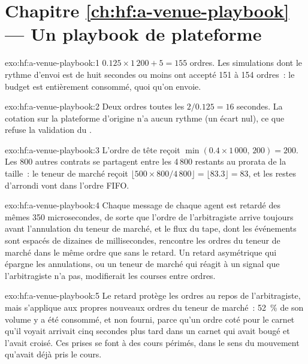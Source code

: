 \section*{Chapitre \ref{ch:hf:a-venue-playbook} --- Un playbook de plateforme}

\begin{solution}{exo:hf:a-venue-playbook:1}
$0.125\times1\,200+5=155$ ordres. Les simulations dont le rythme d'envoi est de huit secondes ou moins ont accepté 151 à 154 ordres~: le budget est entièrement consommé, quoi qu'on envoie.
\end{solution}

\begin{solution}{exo:hf:a-venue-playbook:2}
Deux ordres toutes les $2/0.125=16$ secondes. La cotation sur la plateforme d'origine n'a aucun rythme (un écart nul), ce que refuse la validation du .
\end{solution}

\begin{solution}{exo:hf:a-venue-playbook:3}
L'ordre de tête reçoit $\min(0.4\times1\,000,\,200)=200$. Les 800 autres contrats se partagent entre les 4\,800 restants au prorata de la taille~: le
teneur de marché reçoit $\lfloor 500\times800/4\,800\rfloor=\lfloor83.3\rfloor=83$, et les restes d'arrondi vont dans l'ordre FIFO.
\end{solution}

\begin{solution}{exo:hf:a-venue-playbook:4}
Chaque message de chaque agent est retardé des mêmes 350 microsecondes, de sorte que l'ordre de l'arbitragiste arrive toujours avant l'annulation du teneur de marché, et le
flux du tape, dont les événements sont espacés de dizaines de millisecondes, rencontre les ordres du teneur de marché dans le même ordre que sans le retard. Un retard asymétrique
qui épargne les annulations, ou un teneur de marché qui réagit à un signal que l'arbitragiste n'a pas, modifierait les courses entre ordres.
\end{solution}

\begin{solution}{exo:hf:a-venue-playbook:5}
Le retard protège les ordres au repos de l'arbitragiste, mais s'applique aux propres nouveaux ordres du teneur de marché~: 52~\% de son volume y a été consommé, et non fourni,
parce qu'un ordre coté pour le carnet qu'il voyait arrivait cinq secondes plus tard dans un carnet qui avait bougé et l'avait croisé. Ces prises se font à des cours périmés, dans
le sens du mouvement qu'avait déjà pris le cours.
\end{solution}

